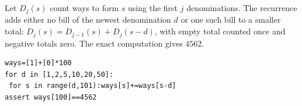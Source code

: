 Let $D_j(s)$ count ways to form $s$ using the first $j$ denominations. The recurrence adds either no bill of the newest denomination $d$ or one such bill to a smaller total: $D_j(s)=D_{j-1}(s)+D_j(s-d)$, with empty total counted once and negative totals zero. The exact computation gives $\boxed{4562}$.
\begin{verbatim}
ways=[1]+[0]*100
for d in [1,2,5,10,20,50]:
 for s in range(d,101):ways[s]+=ways[s-d]
assert ways[100]==4562
\end{verbatim}
